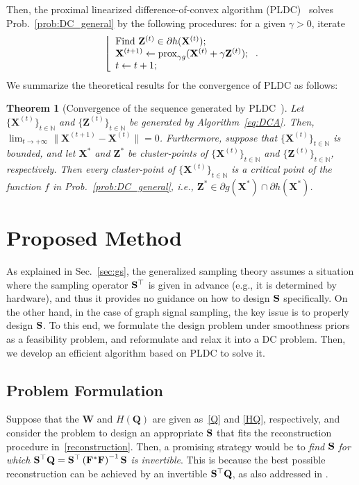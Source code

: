 \documentclass[10pt,journal]{IEEEtran}
\theoremstyle{plain}
\newtheorem{theo}{Theorem}
\begin{document}
Then, the proximal linearized difference-of-convex algorithm (PLDC)~\cite{Souza2016PLDC} solves Prob.~\eqref{prob:DC_general} by the following procedures: for a given $\gamma>0$, iterate
\begin{equation}
    \label{eq:DCA}
    \left\lfloor
    \begin{array}{l}
        \mbox{Find } \mathbf{Z}^{(t)} \in \partial h(\mathbf{X}^{(t)}); \\
        \mathbf{X}^{(t + 1)} \leftarrow \mathrm{prox}_{\gamma g}(\mathbf{X}^{(t)} + \gamma\mathbf{Z}^{(t)});\\
        t \leftarrow t + 1;
    \end{array}
    \right..
\end{equation}
We summarize the theoretical results for the convergence of PLDC as follows:
\begin{theo}[Convergence of the sequence generated by PLDC~\cite{Souza2016PLDC}]
\label{theo:convergence_PLDC}
Let $\{\mathbf{X}^{(t)}\}_{t\in\mathbb{N}}$ and $\{\mathbf{Z}^{(t)}\}_{t\in\mathbb{N}}$ be generated by Algorithm~\eqref{eq:DCA}. Then, $\lim_{t\rightarrow+\infty}\|\mathbf{X}^{(t+1)}-\mathbf{X}^{(t)}\|=0$. Furthermore, suppose that $\{\mathbf{X}^{(t)}\}_{t\in\mathbb{N}}$ is bounded, and let $\mathbf{X}^*$ and $\mathbf{Z}^*$ be cluster-points of $\{\mathbf{X}^{(t)}\}_{t\in\mathbb{N}}$ and $\{\mathbf{Z}^{(t)}\}_{t\in\mathbb{N}}$, respectively. Then every cluster-point of $\{\mathbf{X}^{(t)}\}_{t\in\mathbb{N}}$ is a critical point of the function $f$ in Prob.~\eqref{prob:DC_general}, i.e., $\mathbf{Z}^*\in \partial g(\mathbf{X}^*)\cap\partial h(\mathbf{X}^*)$.
\end{theo}

\section{Proposed Method}
As explained in Sec.~\ref{sec:gs}, the generalized sampling theory assumes a situation where the sampling operator $\mathbf{S}^\top$ is given in advance (e.g., it is determined by hardware), and thus it provides no guidance on how to design $\mathbf{S}$ specifically. On the other hand, in the case of graph signal sampling, the key issue is to properly design $\mathbf{S}$. To this end, we formulate the design problem under smoothness priors as a feasibility problem, and reformulate and relax it into a DC problem. Then, we develop an efficient algorithm based on PLDC to solve it.

\subsection{Problem Formulation}
Suppose that the $\mathbf{W}$ and $H(\mathbf{Q})$ are given as~\eqref{Q} and \eqref{HQ}, respectively, and consider the problem to design an appropriate $\mathbf{S}$ that fits the reconstruction procedure in~\eqref{reconstruction}. Then, a promising strategy would be to \textit{find $\mathbf{S}$ for which $\mathbf{S}^\top\mathbf{Q}=\mathbf{S}^\top\left(\mathbf{F}^*\mathbf{F}\right)^{-1}\mathbf{S}$ is invertible}. This is because the best possible reconstruction can be achieved by an invertible $\mathbf{S}^\top\mathbf{Q}$, as also addressed in \cite{Hara2022GSSS}.
\end{document}
